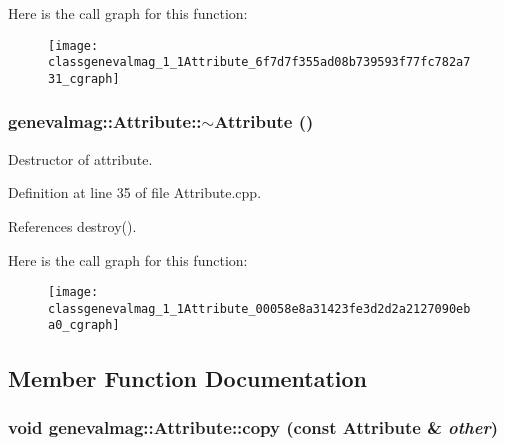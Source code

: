 Here is the call graph for this function:\nopagebreak
\begin{figure}[H]
\begin{center}
\leavevmode
\texttt{[image: classgenevalmag\_1\_1Attribute\_6f7d7f355ad08b739593f77fc782a731\_cgraph]}
\end{center}
\end{figure}
\hypertarget{classgenevalmag_1_1Attribute_00058e8a31423fe3d2d2a2127090eba0}{
\subsubsection[{$\sim$Attribute}]{\setlength{\rightskip}{0pt plus 5cm}genevalmag::Attribute::$\sim$Attribute ()}}
\label{classgenevalmag_1_1Attribute_00058e8a31423fe3d2d2a2127090eba0}


Destructor of attribute. 

Definition at line 35 of file Attribute.cpp.

References destroy().

Here is the call graph for this function:\nopagebreak
\begin{figure}[H]
\begin{center}
\leavevmode
\texttt{[image: classgenevalmag\_1\_1Attribute\_00058e8a31423fe3d2d2a2127090eba0\_cgraph]}
\end{center}
\end{figure}


\subsection{Member Function Documentation}
\hypertarget{classgenevalmag_1_1Attribute_55686b1777729123c1cd8ad1e813ea53}{
\subsubsection[{copy}]{\setlength{\rightskip}{0pt plus 5cm}void genevalmag::Attribute::copy (const {\bf Attribute} \& {\em other})}}
\label{classgenevalmag_1_1Attribute_55686b1777729123c1cd8ad1e813ea53}


